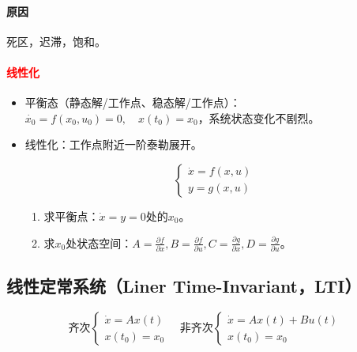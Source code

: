 \documentclass[
12pt, %
a4paper, 
oneside, %
]{scrartcl}
\begin{document}
\paragraph{原因}
死区，迟滞，饱和。
\paragraph{\textcolor{red}{线性化}}
\begin{itemize}
\item 平衡态（静态解/工作点、稳态解/工作点）：$ \dot{x_0} = f(x_0, u_0) = 0, \quad x(t_0) = x_0 $，系统状态变化不剧烈。
\item 线性化：工作点附近一阶泰勒展开。

\begin{minipage}{0.3\textwidth}
$$ \begin{cases} \dot{x} = f(x, u) \\ y = g(x, u) \end{cases} $$
\end{minipage}
\begin{minipage}{0.7\textwidth}
\begin{enumerate}
\item 求平衡点：$ \dot{x} = y = 0 $处的$ x_0 $。
\item 求$ x_0 $处状态空间：$ A = \frac{\partial f}{\partial x}, B = \frac{\partial f}{\partial u}, C = \frac{\partial g}{\partial x}, D = \frac{\partial g}{\partial u} $。
\end{enumerate}
\end{minipage}
\end{itemize}
\subsection[线性定常系统]{线性定常系统（Liner Time-Invariant，LTI）}
$$ \text{齐次} \begin{cases} \dot{x} = A x(t) \\ x(t_0) = x_0 \end{cases} \quad \text{非齐次} \begin{cases} \dot{x} = A x(t) + B u(t) \\ x(t_0) = x_0 \end{cases} $$
\end{document}
